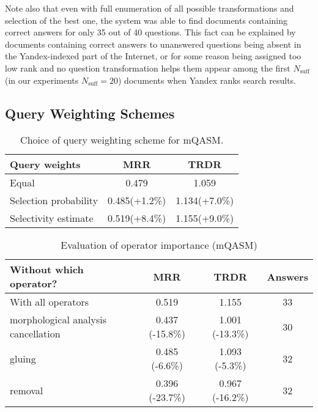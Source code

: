 \documentclass{article}
\begin{document}
Note also that even with full enumeration of all possible transformations and
selection of the best one, the system was able to find documents containing correct
answers for only 35 out of 40 questions. This fact can be explained by documents
containing correct answers to unanswered questions being absent
in the Yandex-indexed part of the Internet, or for some reason being
assigned too low rank and no question transformation
helps them appear among the first
$N_{\text{suff}}$ (in our experiments $N_{\text{suff}}=20$)
documents when Yandex ranks search results.

\subsection{Query Weighting Schemes}

\begin{table*}[tb]
\begin{center}
\begin{tabular}{|l|c|c|}
\hline
Query weights & MRR & TRDR \\
\hline
\hline
Equal & 0.479 & 1.059 \\
Selection probability & 0.485(+1.2\%) & 1.134(+7.0\%) \\
Selectivity estimate & 0.519(+8.4\%) & 1.155(+9.0\%) \\
\hline
\end{tabular}
\caption{Choice of query weighting scheme for mQASM.}
\label{table:weighting}
\end{center}
\end{table*}

\begin{table*}[bt]
\begin{center}
\begin{tabular}{|l|c|c|c|}
\hline
Without which operator? & MRR & TRDR & Answers \\
\hline
\hline
With all operators & 0.519 & 1.155 & 33 \\
 morphological analysis cancellation & 0.437 (-15.8\%)  & 1.001 (-13.3\%) & 30 \\
 gluing & 0.485 (-6.6\%) & 1.093 (-5.3\%) & 32 \\
 removal & 0.396 (-23.7\%) & 0.967 (-16.2\%) & 32 \\
\hline
\end{tabular}
\caption{Evaluation of operator importance (mQASM)}
\label{table:operators}
\end{center}
\end{table*}
\end{document}
